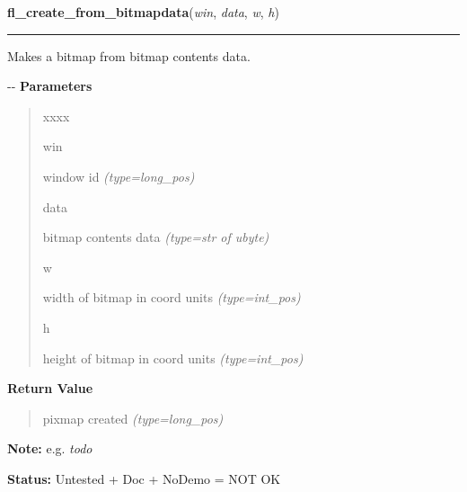     \vspace{0.5ex}

\hspace{.8\funcindent}\begin{boxedminipage}{\funcwidth}

    \raggedright \textbf{fl\_create\_from\_bitmapdata}(\textit{win}, \textit{data}, \textit{w}, \textit{h})

    \vspace{-1.5ex}

    \rule{\textwidth}{0.5\fboxrule}
\setlength{\parskip}{2ex}

Makes a bitmap from bitmap contents data.

-{}-
\setlength{\parskip}{1ex}
      \textbf{Parameters}
      \vspace{-1ex}

      \begin{quote}
        \begin{Ventry}{xxxx}

          \item[win]


window id
            {\it (type=long\_pos)}

          \item[data]


bitmap contents data
            {\it (type=str of ubyte)}

          \item[w]


width of bitmap in coord units
            {\it (type=int\_pos)}

          \item[h]


height of bitmap in coord units
            {\it (type=int\_pos)}

        \end{Ventry}

      \end{quote}

      \textbf{Return Value}
    \vspace{-1ex}

      \begin{quote}

pixmap created
      {\it (type=long\_pos)}

      \end{quote}

\textbf{Note:} 
e.g. \emph{todo}


\textbf{Status:} 
Untested + Doc + NoDemo = NOT OK


    \end{boxedminipage}

